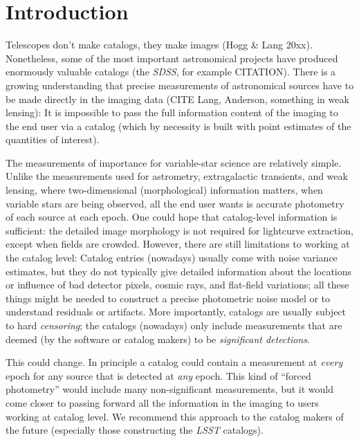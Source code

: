 \documentclass[12pt,preprint]{aastex}
\begin{document}

\section{Introduction}
\label{sec:intro}

Telescopes don't make catalogs, they make images (Hogg \& Lang 20xx).
Nonetheless, some of the most important astronomical projects have produced enormously valuable catalogs
(the \textsl{SDSS}, for example CITATION).
There is a growing understanding that precise measurements of astronomical sources have to be made directly in the imaging data
(CITE Lang, Anderson, something in weak lensing):
It is impossible to pass the full information content of the imaging to the end user via a catalog
(which by necessity is built with point estimates of the quantities of interest).

The measurements of importance for variable-star science are relatively simple.
Unlike the measurements used for astrometry, extragalactic transients, and weak lensing,
where two-dimensional (morphological) information matters,
when variable stars are being observed, all the end user wants is accurate photometry of each source at each epoch.
One could hope that catalog-level information is sufficient:
the detailed image morphology is not required for lightcurve extraction, except when fields are crowded.
However, there are still limitations to working at the catalog level:
Catalog entries (nowadays) usually come with noise variance estimates,
but they do not typically give detailed information about the locations or influence of
bad detector pixels, cosmic rays, and flat-field variations;
all these things might be needed to construct a precise photometric noise model or to understand residuals or artifacts.
More importantly, catalogs are usually subject to hard \emph{censoring};
the catalogs (nowadays) only include measurements that are deemed (by the software or catalog makers)
to be \emph{significant detections}.

This could change.
In principle a catalog could contain a measurement at \emph{every} epoch for any source that is detected at \emph{any} epoch.
This kind of ``forced photometry'' would include many non-significant measurements,
but it would come closer to passing forward all the information in the imaging to users working at catalog level.
We recommend this approach to the catalog makers of the future (especially those constructing the \textsl{LSST} catalogs).
\end{document}
